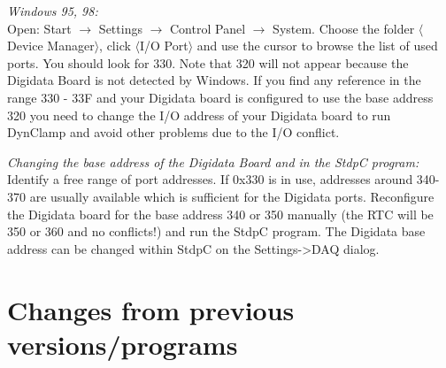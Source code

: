 \documentclass{article}
\begin{document}
\noindent
{\em Windows 95, 98: } \\ Open: Start $\rightarrow$ Settings
$\rightarrow$ Control Panel $\rightarrow$ System. Choose the folder
$\langle$Device Manager$\rangle$, click $\langle$I/O Port$\rangle$ and
use the cursor to browse the list of used ports. You should look for
330.  Note that 320 will not appear because the Digidata Board is not
detected by Windows. If you find any reference in the range 330 - 33F
and your Digidata board is configured to use the base address 320 you
need to change the I/O address of your Digidata board to run DynClamp
and avoid other problems due to the I/O conflict.
 
\noindent
{\em Changing the base address of the Digidata Board and in the StdpC
  program: } \\ Identify a free range of port addresses.  If 0x330 is
in use, addresses around 340-370 are usually available which is
sufficient for the Digidata ports. Reconfigure the Digidata
board for the base address 340 or 350 manually (the RTC will be 350 or
360 and no conflicts!) and run the StdpC program. The Digidata base
address can be changed within StdpC on the Settings->DAQ dialog.

\section{Changes from previous versions/programs}
\end{document}
